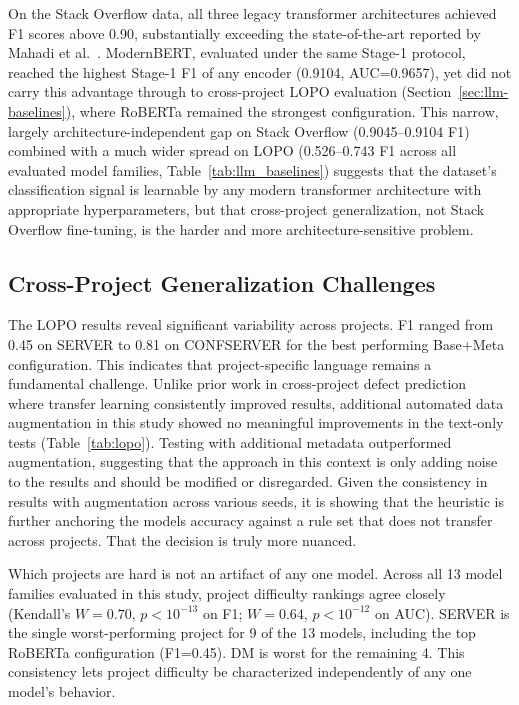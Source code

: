 \documentclass[preprint,12pt]{elsarticle}
\begin{document}
On the Stack Overflow data, all three legacy transformer architectures achieved F1 scores above 0.90, substantially exceeding the state-of-the-art reported by Mahadi et al.~\cite{mahadi2021}. ModernBERT, evaluated under the same Stage-1 protocol, reached the highest Stage-1 F1 of any encoder (0.9104, AUC=0.9657), yet did not carry this advantage through to cross-project LOPO evaluation (Section~\ref{sec:llm-baselines}), where RoBERTa remained the strongest configuration. This narrow, largely architecture-independent gap on Stack Overflow (0.9045--0.9104 F1) combined with a much wider spread on LOPO (0.526--0.743 F1 across all evaluated model families, Table~\ref{tab:llm_baselines}) suggests that the dataset's classification signal is learnable by any modern transformer architecture with appropriate hyperparameters, but that cross-project generalization, not Stack Overflow fine-tuning, is the harder and more architecture-sensitive problem.

\subsection{Cross-Project Generalization Challenges}
\label{sec:cross-project}

The LOPO results reveal significant variability across projects. F1 ranged from 0.45 on SERVER to 0.81 on CONFSERVER for the best performing Base+Meta configuration. This indicates that project-specific language remains a fundamental challenge. Unlike prior work in cross-project defect prediction~\cite{nam2013, dam2021} where transfer learning consistently improved results, additional automated data augmentation in this study showed no meaningful improvements in the text-only tests (Table~\ref{tab:lopo}). Testing with additional metadata outperformed augmentation, suggesting that the approach in this context is only adding noise to the results and should be modified or disregarded. Given the consistency in results with augmentation across various seeds, it is showing that the heuristic is further anchoring the models accuracy against a rule set that does not transfer across projects. That the decision is truly more nuanced.

Which projects are hard is not an artifact of any one model. Across all 13 model families evaluated in this study, project difficulty rankings agree closely (Kendall's $W=0.70$, $p<10^{-13}$ on F1; $W=0.64$, $p<10^{-12}$ on AUC). SERVER is the single worst-performing project for 9 of the 13 models, including the top RoBERTa configuration (F1=0.45). DM is worst for the remaining 4. This consistency lets project difficulty be characterized independently of any one model's behavior. 
\end{document}
